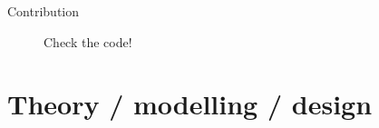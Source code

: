 \documentclass[handout]{beamer}\mode<handout>{\usetheme{AMSBolognaFC}}
\begin{document}
\begin{frame}{Contribution}
\begin{figure}
\begin{minipage}{0.3\textwidth}
            \caption{Check the code!}
        \end{minipage}
        \hfill
        \label{fig:telegram-bot}
    \end{figure}


\end{frame}

\section{Theory / modelling / design}
\end{document}

